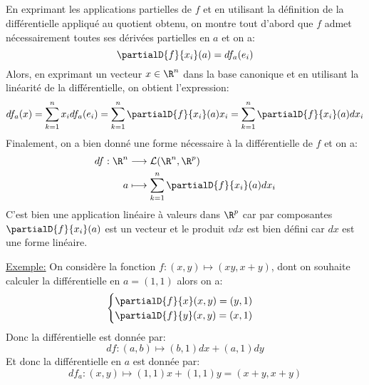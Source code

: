 \subsection*{}
En exprimant les applications partielles de \(f\) et en utilisant la définition de la différentielle appliqué au quotient obtenu, on montre tout d'abord que \(f\) admet nécessairement toutes ses dérivées partielles en \(a\) et on a:
\[
   \partialD{f}{x_i}(a) = df_a(e_i)   
\]
Alors, en exprimant un vecteur \(x \in \R^n\) dans la base canonique et en utilisant la linéarité de la différentielle, on obtient l'expression:
\[
   df_a(x) = \sum_{k=1}^{n}x_i df_a(e_i) = \sum_{k=1}^{n} \partialD{f}{x_i}(a) x_i = \sum_{k=1}^{n} \partialD{f}{x_i}(a) dx_i
\]
Finalement, on a bien donné une forme nécessaire à la différentielle de \(f\) et on a:
\[
   \begin{aligned}
      df : \R^n &\longrightarrow \mathcal{L}(\R^n, \R^p)\\
      a &\longmapsto \sum_{k=1}^{n} \partialD{f}{x_i}(a) dx_i
   \end{aligned}  
\]
C'est bien une application linéaire à valeurs dans \(\R^p\) car par composantes \(\partialD{f}{x_i}(a)\) est un vecteur et le produit \(vdx\) est bien défini car \(dx\) est une forme linéaire.\<

\underline{Exemple:} On considère la fonction \(f : (x, y) \mapsto (xy, x + y)\), dont on souhaite calculer la différentielle en \(a = (1, 1)\) alors on a:
\[
   \begin{cases}
      \partialD{f}{x}(x, y) = (y, 1)\\
      \partialD{f}{y}(x, y) = (x, 1)
   \end{cases}   
\]
Donc la différentielle est donnée par:
\[
   df : (a, b) \mapsto (b, 1)dx + (a, 1)dy
\]
Et donc la différentielle en \(a\) est donnée par:
\[
   df_a : (x, y) \mapsto (1, 1)x + (1, 1)y = (x + y, x + y)
\]

